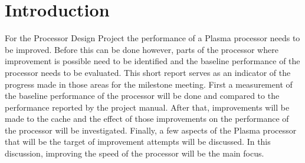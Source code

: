 \documentclass[final]{article}
\begin{document}
\section{Introduction}
For the Processor Design Project the performance of a Plasma processor needs to be improved.
Before this can be done however, parts of the processor where improvement is possible need to be identified and the baseline performance of the processor needs to be evaluated.
This short report serves as an indicator of the progress made in those areas for the milestone meeting.
First a measurement of the baseline performance of the processor will be done and compared to the performance reported by the project manual.
After that, improvements will be made to the cache and the effect of those improvements on the performance of the processor will be investigated.
Finally, a few aspects of the Plasma processor that will be the target of improvement attempts will be discussed.
In this discussion, improving the speed of the processor will be the main focus.
\end{document}
